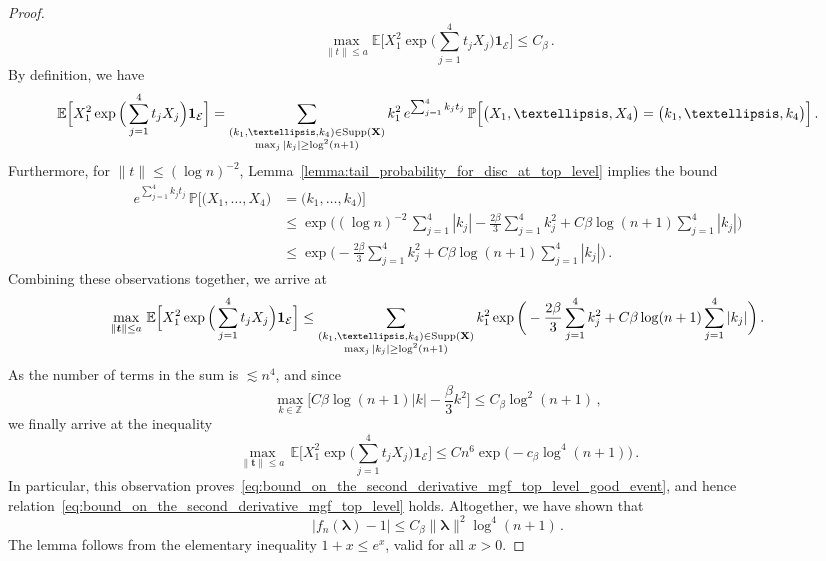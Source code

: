\documentclass[10pt,a4paper]{amsart}
\def\la{{\lambda}}
\newcommand{\bE}{\mathbb E}
\newcommand{\bP}{\mathbb P}
\newcommand{\bZ}{\mathbb Z}
\begin{document}
\begin{proof}
\begin{equation}
			\max_{\|t\|\le a}\bE\Big[X_1^2 \exp\Big(\sum_{j=1}^{4}t_j X_j\Big)\mathbf{1}_{\mathcal{E}}\Big] \le C_\beta \, .
		\end{equation}
		By definition, we have
		\begin{equation*}
			\bE\Big[X_1^2 \exp\Big(\sum_{j=1}^{4}t_j X_j\Big)\mathbf{1}_{\mathcal{E}}\Big] = \sum_{\substack{(k_1,\ldots,k_4)\in \text{Supp}(\bf{X}) \\ \max_{j}|k_j|\ge \log^2(n+1)}} k_1^2  \, e^{\sum_{j=1}^{4} k_j t_j} \, \bP\Big[\big(X_1,\ldots,X_4\big) = \big(k_1,\ldots,k_4\big)\Big] \, .
		\end{equation*}
		Furthermore, for $\|t\| \le (\log n)^{-2}$, Lemma~\ref{lemma:tail_probability_for_disc_at_top_level} implies the bound
		\begin{align*}
			e^{\sum_{j=1}^{4} k_j t_j} \, \bP\Big[\big(X_1,\ldots,X_4\big) &= \big(k_1,\ldots,k_4\big)\Big] \\ & \le \exp\bigg((\log n)^{-2} \, \sum_{j=1}^{4} |k_j|-\frac{2\beta}{3}\sum_{j=1}^{4} k_j^2 + C\beta \log(n+1) \sum_{j=1}^4 |k_j|\bigg) \\ &\le \exp\bigg(-\frac{2\beta}{3}\sum_{j=1}^{4} k_j^2 + C\beta \log(n+1) \sum_{j=1}^4 |k_j|\bigg) \, .
		\end{align*}
		Combining these observations together, we arrive at
		\begin{equation*}
			\max_{\|\boldsymbol{t}\|\le a} \,\bE\Big[X_1^2 \exp\Big(\sum_{j=1}^{4}t_j X_j\Big)\mathbf{1}_{\mathcal{E}}\Big] \le \sum_{\substack{(k_1,\ldots,k_4)\in \text{Supp}(\bf{X}) \\ \max_{j}|k_j|\ge \log^2(n+1)}} k_1^2 \exp\bigg(-\frac{2\beta}{3}\sum_{j=1}^{4} k_j^2 + C\beta \log(n+1) \sum_{j=1}^4 |k_j|\bigg) \, .
		\end{equation*}
		As the number of terms in the sum is $\lesssim n^4$, and since
		\[
		\max_{k\in \bZ} \Big[C \beta \log(n+1) |k| - \frac{\beta}{3}k^2 \Big] \le C_\beta \log^2(n+1)\, ,
		\]
		we finally arrive at the inequality 
		\[
		\max_{\|\boldsymbol{t}\|\le a} \,\bE\Big[X_1^2 \exp\Big(\sum_{j=1}^{4}t_j X_j\Big)\mathbf{1}_{\mathcal{E}}\Big] \le Cn^6 \exp\Big(-c_\beta \log^4(n+1)\Big)\, .
		\]
		In particular, this observation proves~\eqref{eq:bound_on_the_second_derivative_mgf_top_level_good_event}, and hence relation~\eqref{eq:bound_on_the_second_derivative_mgf_top_level} holds. Altogether, we have shown that
		\[
		\big|f_n(\boldsymbol{\la}) - 1\big|\le  C_\beta  \|\boldsymbol{\la}\|^2 \log^4(n+1) \, .
		\]
		The lemma follows from the elementary inequality $1+x\le e^x$, valid for all $x>0$.
	\end{proof}
\end{document}
